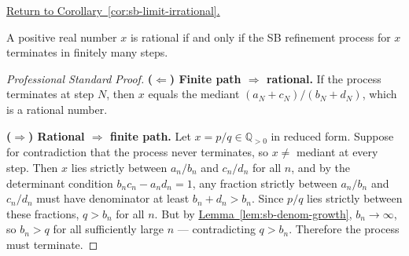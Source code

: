 
\newpage
{}
\label{prf:sb-limit-irrational}

\begin{remark*}[Return]
\hyperref[cor:sb-limit-irrational]{Return to Corollary~\ref*{cor:sb-limit-irrational}.}
\end{remark*}

\begin{corollary*}
A positive real number $x$ is rational if and only if the SB refinement
process for $x$ terminates in finitely many steps.
\end{corollary*}

\begin{proof}[Professional Standard Proof]
\LRAProofBodyStart
\textbf{($\Leftarrow$) Finite path $\Rightarrow$ rational.}
If the process terminates at step $N$, then $x$ equals the mediant
$(a_N + c_N)/(b_N + d_N)$, which is a rational number.

\textbf{($\Rightarrow$) Rational $\Rightarrow$ finite path.}
Let $x = p/q \in \mathbb{Q}_{>0}$ in reduced form.  Suppose for
contradiction that the process never terminates, so $x \neq$ mediant at
every step.  Then $x$ lies strictly between $a_n/b_n$ and $c_n/d_n$ for
all $n$, and by the determinant condition $b_n c_n - a_n d_n = 1$, any
fraction strictly between $a_n/b_n$ and $c_n/d_n$ must have denominator
at least $b_n + d_n > b_n$.  Since $p/q$ lies strictly between these
fractions, $q > b_n$ for all $n$.  But by
\hyperref[lem:sb-denom-growth]{Lemma~\ref*{lem:sb-denom-growth}},
$b_n \to \infty$, so $b_n > q$ for all sufficiently large $n$ ---
contradicting $q > b_n$.  Therefore the process must terminate.
\end{proof}

